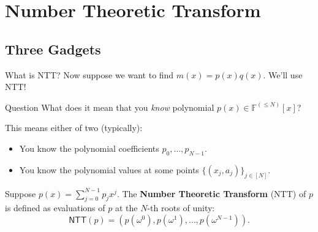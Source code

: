 \documentclass{zkdl-presentation-template}
\begin{document}
    \section{Number Theoretic Transform}

    \subsection{Three Gadgets}
    \begin{frame}{What is NTT?}
        Now suppose we want to find $m(x) = p(x)q(x)$. We'll use NTT!\pause
        
        \begin{alertblock}{Question}
            What does it mean that you \emph{know} polynomial $p(x) \in \mathbb{F}^{(\leq N)}[x]$?\pause
        \end{alertblock}

        This means either of two (typically):
        \begin{itemize}
            \item You know the polynomial coefficients $p_0,\dots,p_{N-1}$.\pause
            \item You know the polynomial values at some points $\{(x_j,a_j)\}_{j \in [N]}$.\pause
        \end{itemize}

        \begin{definition}[NTT]
            Suppose $p(x) = \sum_{j=0}^{N-1}p_jx^j$. The \textbf{Number Theoretic Transform} (NTT) of $p$ is defined as evaluations of $p$ at the $N$-th roots of unity:\pause
            \begin{equation*}
                \mathsf{NTT}(p) = \left(p(\omega^0), p(\omega^1), \dots, p(\omega^{N-1})\right).
            \end{equation*}
        \end{definition}
    \end{frame}
\end{document}
